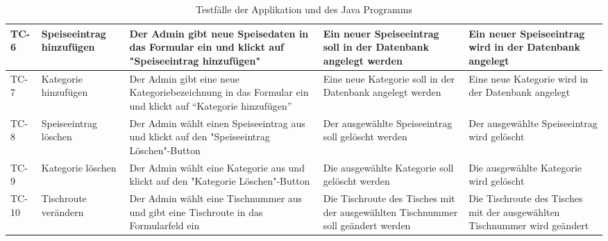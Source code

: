 \begin{table}[H]
\centering
\begin{tabular}{|p{1cm}|p{3cm}|p{3cm}|p{3cm}|p{3cm}|} 
\hline TC-6 & Speiseeintrag hinzufügen & Der Admin gibt neue Speisedaten in das Formular ein und klickt auf "Speiseeintrag hinzufügen" & Ein neuer Speiseeintrag soll in der Datenbank angelegt werden & Ein neuer Speiseeintrag wird in der Datenbank angelegt \\\hline
\hline TC-7 & Kategorie hinzufügen & Der Admin gibt eine neue Kategoriebezeichnung in das Formular ein und klickt auf “Kategorie hinzufügen” & Eine neue Kategorie soll in der Datenbank angelegt werden & Eine neue Kategorie wird in der Datenbank angelegt \\\hline
\hline TC-8 & Speiseeintrag löschen & Der Admin wählt einen Speiseeintrag aus und klickt auf den "Speiseeintrag Löschen"-Button & Der ausgewählte Speiseeintrag soll gelöscht werden & Der ausgewählte Speiseeintrag wird gelöscht \\\hline
\hline TC-9 & Kategorie löschen & Der Admin wählt eine Kategorie aus und klickt auf den "Kategorie Löschen"-Button & Die ausgewählte Kategorie soll gelöscht werden & Die ausgewählte Kategorie wird gelöscht \\\hline
\hline TC-10 & Tischroute verändern & Der Admin wählt eine Tischnummer aus und gibt eine Tischroute in das Formularfeld ein & Die Tischroute des Tisches mit der ausgewählten Tischnummer soll geändert werden & Die Tischroute des Tisches mit der ausgewählten Tischnummer wird geändert \\\hline
\end{tabular}
\caption{Testfälle der Applikation und des Java Programms}
\end{table}

